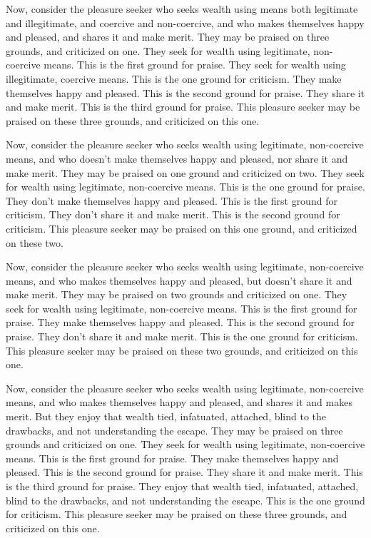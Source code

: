 \documentclass[12pt,openany]{book}%
\begin{document}
Now, consider the pleasure seeker who seeks wealth using means both legitimate and illegitimate, and coercive and non-coercive, and who makes themselves happy and pleased, and shares it and make merit. They may be praised on three grounds, and criticized on one. They seek for wealth using legitimate, non-coercive means. This is the first ground for praise. They seek for wealth using illegitimate, coercive means. This is the one ground for criticism. They make themselves happy and pleased. This is the second ground for praise. They share it and make merit. This is the third ground for praise. This pleasure seeker may be praised on these three grounds, and criticized on this one. 

Now, consider the pleasure seeker who seeks wealth using legitimate, non-coercive means, and who doesn’t make themselves happy and pleased, nor share it and make merit. They may be praised on one ground and criticized on two. They seek for wealth using legitimate, non-coercive means. This is the one ground for praise. They don’t make themselves happy and pleased. This is the first ground for criticism. They don’t share it and make merit. This is the second ground for criticism. This pleasure seeker may be praised on this one ground, and criticized on these two. 

Now, consider the pleasure seeker who seeks wealth using legitimate, non-coercive means, and who makes themselves happy and pleased, but doesn’t share it and make merit. They may be praised on two grounds and criticized on one. They seek for wealth using legitimate, non-coercive means. This is the first ground for praise. They make themselves happy and pleased. This is the second ground for praise. They don’t share it and make merit. This is the one ground for criticism. This pleasure seeker may be praised on these two grounds, and criticized on this one. 

Now, consider the pleasure seeker who seeks wealth using legitimate, non-coercive means, and who makes themselves happy and pleased, and shares it and makes merit. But they enjoy that wealth tied, infatuated, attached, blind to the drawbacks, and not understanding the escape. They may be praised on three grounds and criticized on one. They seek for wealth using legitimate, non-coercive means. This is the first ground for praise. They make themselves happy and pleased. This is the second ground for praise. They share it and make merit. This is the third ground for praise. They enjoy that wealth tied, infatuated, attached, blind to the drawbacks, and not understanding the escape. This is the one ground for criticism. This pleasure seeker may be praised on these three grounds, and criticized on this one. 
\end{document}
